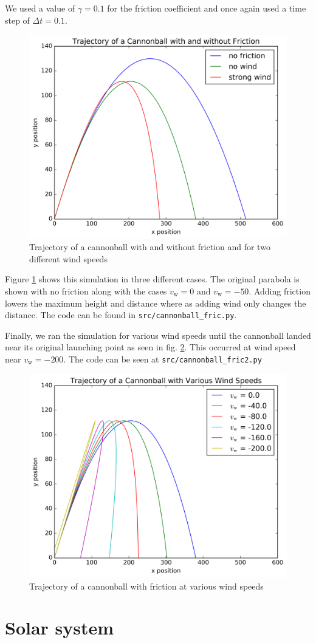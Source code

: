 \documentclass[a4paper,11pt,bibtotoc]{scrartcl}
\begin{document}
We used a value of $\gamma = 0.1$ for the friction coefficient and
once again used a time step of $\Delta t = 0.1$.

\begin{figure}
  \includegraphics[width=0.7\linewidth]{../fig/cannonball2.png}
  \centering
  \caption{Trajectory of a cannonball with and without friction and
    for two different wind speeds}
  \label{fig:cannonball2}
\end{figure}

Figure \ref{fig:cannonball2} shows this simulation in three different
cases. The original parabola is shown with no friction along with the
cases $v_\mathrm{w} = 0$ and $v_\mathrm{w} = -50$. Adding friction
lowers the maximum height and distance where as adding wind only
changes the distance. The code can be found in
\texttt{src/cannonball\_fric.py}.

Finally, we ran the simulation for various wind speeds until the
cannonball landed near its original launching point as seen in
fig. \ref{fig:cannonball3}. This occurred at wind speed near
$v_\mathrm{w} = -200$. The code can be seen at
\texttt{src/cannonball\_fric2.py}

\begin{figure}
  \includegraphics[width=0.7\linewidth]{../fig/cannonball3.png}
  \centering
  \caption{Trajectory of a cannonball with friction at various wind
    speeds}
  \label{fig:cannonball3}
\end{figure}

\section{Solar system}
\end{document}
